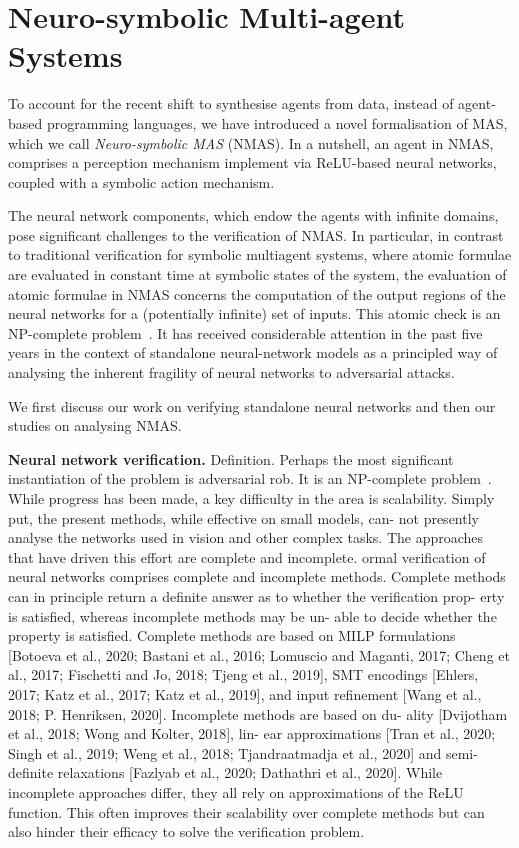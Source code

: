 \documentclass{article}
\begin{document}
\section{Neuro-symbolic Multi-agent Systems}



To account for the recent shift to synthesise agents from data, instead of
agent-based programming languages, we have introduced a novel formalisation of
MAS, which we  call {\em Neuro-symbolic MAS} (NMAS). In a nutshell, an agent in
NMAS, comprises a perception mechanism implement via ReLU-based neural networks,
coupled with a symbolic action mechanism.  

The neural network components, which endow the agents with infinite domains,
pose significant  challenges to the verification of NMAS.  In particular, in
contrast to traditional verification for symbolic multiagent systems, where
atomic formulae are evaluated in constant time at symbolic states of the system,
the evaluation of atomic formulae in NMAS concerns the computation of the output
regions of the neural networks  for a (potentially infinite) set of inputs.
This atomic check is an NP-complete problem~\cite{Katz+17}. It has received
considerable attention in the past five years in the context of standalone
neural-network models as a principled way of analysing the inherent fragility of
neural networks to adversarial attacks.  

We first discuss our work on verifying standalone neural networks and then our
studies on analysing NMAS.


{\bf Neural network verification.} Definition. 
Perhaps the most significant instantiation of the problem is adversarial rob.
It is an NP-complete problem~\cite{Katz+17}. 
While progress has been made, a key difficulty in the area is scalability. Simply put,
the present methods, while effective on small models, can-
not presently analyse the networks used in vision and other
complex tasks. The approaches that have driven this effort are complete and incomplete.
ormal verification of neural networks comprises complete
and incomplete methods. Complete methods can in principle
return a definite answer as to whether the verification prop-
erty is satisfied, whereas incomplete methods may be un-
able to decide whether the property is satisfied. Complete
methods are based on MILP formulations [Botoeva et al.,
2020; Bastani et al., 2016; Lomuscio and Maganti, 2017;
Cheng et al., 2017; Fischetti and Jo, 2018; Tjeng et al.,
2019], SMT encodings [Ehlers, 2017; Katz et al., 2017;
Katz et al., 2019], and input refinement [Wang et al., 2018;
P. Henriksen, 2020]. Incomplete methods are based on du-
ality [Dvijotham et al., 2018; Wong and Kolter, 2018], lin-
ear approximations [Tran et al., 2020; Singh et al., 2019;
Weng et al., 2018; Tjandraatmadja et al., 2020] and semi-
definite relaxations [Fazlyab et al., 2020; Dathathri et al.,
2020]. While incomplete approaches differ, they all rely on
approximations of the ReLU function. This often improves
their scalability over complete methods but can also hinder
their efficacy to solve the verification problem.
\end{document}
